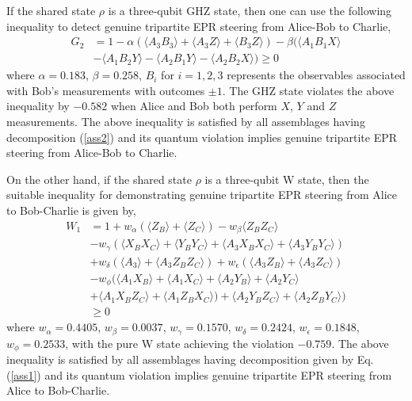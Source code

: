 \documentclass[pra,a4paper,aps,twocolumn,showpacs,superscriptaddress,groupedaddress]{revtex4}
\begin{document}
 If the shared state $\rho$ is a three-qubit GHZ state, then one can use the following inequality to detect genuine tripartite EPR steering from Alice-Bob to Charlie,
\begin{align}
G_2 &= 1 - \alpha (\langle A_3B_3\rangle +  \langle A_3Z \rangle + \langle B_3Z \rangle) - \beta( \langle A_1B_1X \rangle \nonumber \\
& -  \langle A_1B_2Y\rangle -  \langle A_2B_1Y\rangle -   \langle A_2B_2X\rangle )\geq 0
\label{GHZ2}
\end{align}
where $\alpha = 0.183$, $\beta = 0.258$, $B_i$ for $i=1, 2, 3$ represents the observables associated with Bob's measurements with outcomes $\pm 1$. The GHZ state violates the above inequality by $-0.582$ when Alice and Bob both perform $X$, $Y$ and $Z$ measurements.  The above inequality is satisfied by all assemblages having decomposition (\ref{ass2}) and its quantum violation implies genuine tripartite EPR steering from Alice-Bob to Charlie.

 On the other hand, if the shared state $\rho$ is a three-qubit W state,  then the suitable inequality for demonstrating genuine tripartite EPR steering from Alice to Bob-Charlie is given by,
\begin{align}
W_1 &= 1 + w_{\alpha}(\langle Z_B \rangle + \langle Z_C \rangle) - w_{\beta}  \langle Z_BZ_C\rangle   \nonumber \\
& - w_{\gamma} ( \langle X_B X_C \rangle + \langle Y_B Y_C \rangle + \langle A_3 X_B X_C \rangle + \langle A_3 Y_B Y_C \rangle )  \nonumber \\
& + w_{\delta} ( \langle A_3 \rangle +   \langle A_3Z_BZ_C \rangle ) + w_{\epsilon} ( \langle A_3Z_B\rangle + \langle A_3Z_C \rangle )  \nonumber \\
& - w_{\phi}( \langle A_1X_B\rangle + \langle A_1X_C\rangle + \langle A_2Y_B\rangle + \langle A_2Y_C\rangle  \nonumber \\ 
& + \langle A_1X_BZ_C\rangle + \langle A_1Z_BX_C\rangle ) + \langle A_2Y_BZ_C\rangle + \langle A_2Z_BY_C\rangle ) \nonumber \\
& \geq 0
\label{W1}
\end{align}
where $w_{\alpha}= 0.4405$, $w_{\beta} = 0.0037$,  $w_{\gamma} = 0.1570$, $w_{\delta}= 0.2424$, $w_{\epsilon} = 0.1848$, $w_{\phi}=0.2533$, 
with the pure W state achieving the violation $-0.759$.  The above inequality is satisfied by all assemblages having decomposition given by Eq.(\ref{ass1}) and its quantum violation implies genuine tripartite EPR steering from Alice to Bob-Charlie.
\end{document}
